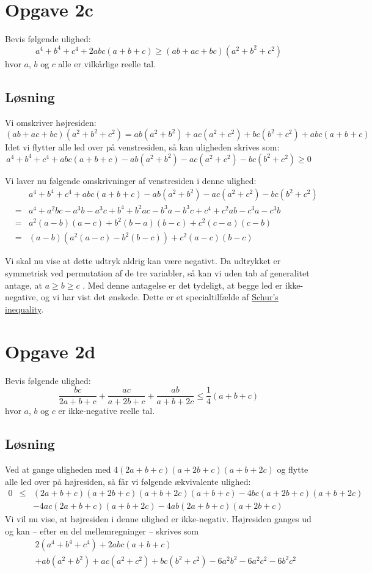 \documentclass[12pt,oneside,a4paper]{article}
\newcommand{\bas}{\begin{eqnarray*}}
\newcommand{\eas}{\end{eqnarray*}}
\begin{document}
\section{Opgave 2c}
Bevis følgende ulighed:
$$
a^4+b^4+c^4+2abc(a+b+c) \ge (ab+ac+bc)(a^2+b^2+c^2)
$$
hvor $a$, $b$ og $c$ alle er vilkårlige reelle tal.

\subsection{Løsning}

Vi omskriver højresiden:
$$
(ab+ac+bc)(a^2+b^2+c^2) = ab(a^2+b^2) + ac(a^2+c^2) + bc(b^2+c^2) + abc(a+b+c)
$$
Idet vi flytter alle led over på venstresiden, så kan uligheden skrives som:
$$
a^4+b^4+c^4+abc(a+b+c) - ab(a^2+b^2) - ac(a^2+c^2) - bc(b^2+c^2) \ge 0
$$

Vi laver nu følgende omskrivninger af venstresiden i denne ulighed:
\bas
&& a^4+b^4+c^4+abc(a+b+c) - ab(a^2+b^2) - ac(a^2+c^2) - bc(b^2+c^2) \\
&=& a^4+a^2bc-a^3b-a^3c + b^4+b^2ac-b^3a-b^3c + c^4+c^2ab-c^3a-c^3b \\
&=& a^2(a-b)(a-c) + b^2(b-a)(b-c) + c^2(c-a)(c-b) \\
&=& (a-b)\left(a^2(a-c)-b^2(b-c)\right) + c^2(a-c)(b-c) 
\eas

Vi skal nu vise at dette udtryk aldrig kan være negativt.  Da udtrykket er
symmetrisk ved permutation af de tre variabler, så kan vi uden tab af
generalitet antage, at $a \ge b \ge c$ .  Med denne antagelse er det tydeligt,
at begge led er ikke-negative, og vi har vist det ønskede.
Dette er et specialtilfælde af \href{https://en.wikipedia.org/wiki/Schur\%27s\_inequality}{Schur's inequality}.

\section{Opgave 2d}
Bevis følgende ulighed:
$$
\frac{bc}{2a+b+c} + \frac{ac}{a+2b+c} + \frac{ab}{a+b+2c} \le \frac 14 (a+b+c)
$$
hvor $a$, $b$ og $c$ er ikke-negative reelle tal.

\subsection{Løsning}
Ved at gange uligheden med $4(2a+b+c)(a+2b+c)(a+b+2c)$ og flytte alle led over på højresiden,
så får vi følgende ækvivalente ulighed:
\bas
0 &\le& (2a+b+c)(a+2b+c)(a+b+2c)(a+b+c) - 4bc(a+2b+c)(a+b+2c) \\
  && - 4ac(2a+b+c)(a+b+2c) - 4ab(2a+b+c)(a+2b+c) 
\eas
Vi vil nu vise, at højresiden i denne ulighed er ikke-negativ.  
Højresiden ganges ud og kan -- efter en del mellemregninger -- skrives som
\bas
&&2(a^4+b^4+c^4) + 2abc(a+b+c) \\
&&+ ab(a^2+b^2)+ac(a^2+c^2)+bc(b^2+c^2) - 6a^2b^2-6a^2c^2-6b^2c^2 
\eas
\end{document}
